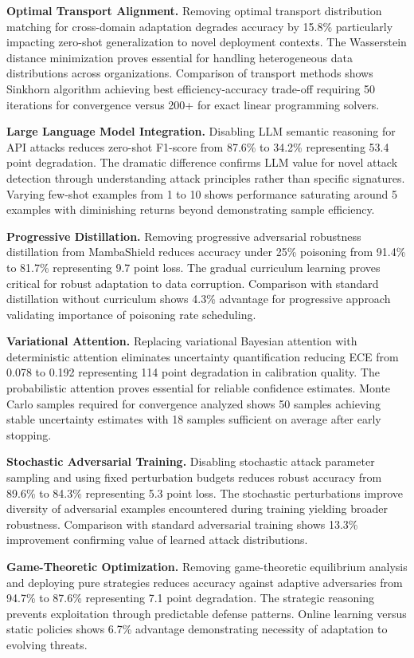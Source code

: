 \textbf{Optimal Transport Alignment.} Removing optimal transport distribution matching for cross-domain adaptation degrades accuracy by 15.8\% particularly impacting zero-shot generalization to novel deployment contexts. The Wasserstein distance minimization proves essential for handling heterogeneous data distributions across organizations. Comparison of transport methods shows Sinkhorn algorithm achieving best efficiency-accuracy trade-off requiring 50 iterations for convergence versus 200+ for exact linear programming solvers.

\textbf{Large Language Model Integration.} Disabling LLM semantic reasoning for API attacks reduces zero-shot F1-score from 87.6\% to 34.2\% representing 53.4 point degradation. The dramatic difference confirms LLM value for novel attack detection through understanding attack principles rather than specific signatures. Varying few-shot examples from 1 to 10 shows performance saturating around 5 examples with diminishing returns beyond demonstrating sample efficiency.

\textbf{Progressive Distillation.} Removing progressive adversarial robustness distillation from MambaShield reduces accuracy under 25\% poisoning from 91.4\% to 81.7\% representing 9.7 point loss. The gradual curriculum learning proves critical for robust adaptation to data corruption. Comparison with standard distillation without curriculum shows 4.3\% advantage for progressive approach validating importance of poisoning rate scheduling.

\textbf{Variational Attention.} Replacing variational Bayesian attention with deterministic attention eliminates uncertainty quantification reducing ECE from 0.078 to 0.192 representing 114 point degradation in calibration quality. The probabilistic attention proves essential for reliable confidence estimates. Monte Carlo samples required for convergence analyzed shows 50 samples achieving stable uncertainty estimates with 18 samples sufficient on average after early stopping.

\textbf{Stochastic Adversarial Training.} Disabling stochastic attack parameter sampling and using fixed perturbation budgets reduces robust accuracy from 89.6\% to 84.3\% representing 5.3 point loss. The stochastic perturbations improve diversity of adversarial examples encountered during training yielding broader robustness. Comparison with standard adversarial training shows 13.3\% improvement confirming value of learned attack distributions.

\textbf{Game-Theoretic Optimization.} Removing game-theoretic equilibrium analysis and deploying pure strategies reduces accuracy against adaptive adversaries from 94.7\% to 87.6\% representing 7.1 point degradation. The strategic reasoning prevents exploitation through predictable defense patterns. Online learning versus static policies shows 6.7\% advantage demonstrating necessity of adaptation to evolving threats.

